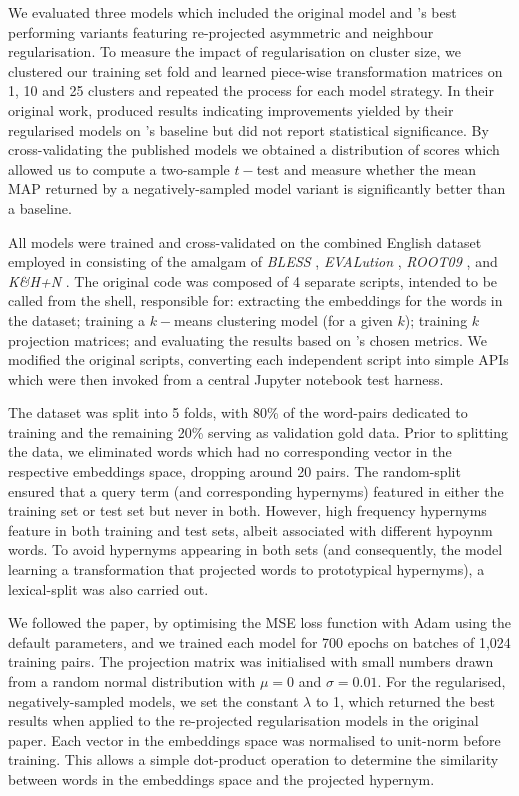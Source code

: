 We evaluated three models which included the original \citep{Fu2014} model and \citeauthor{ustalov2017negative}'s best performing variants featuring re-projected asymmetric and neighbour regularisation.  To measure the impact of regularisation on cluster size, we clustered our training set fold and learned piece-wise transformation matrices on 1, 10 and 25 clusters and repeated the process for each model strategy.  In their original work, \citeauthor{ustalov2017negative} produced results indicating improvements yielded by their regularised models on \citep{Fu2014}'s baseline but did not report statistical significance.  By cross-validating the published models we obtained a distribution of scores which allowed us to compute a two-sample $t-$test and measure whether the mean \ac{MAP} returned by a negatively-sampled model variant is significantly better than a baseline.  

All models were trained and cross-validated on the combined English dataset employed in \citep{ustalov2017negative} consisting of the amalgam of \textit{BLESS} \citep{Baroni2011}, \textit{EVALution} \citep{santus2015evalution}, \textit{ROOT09} \citep{santus2016nine}, and \textit{K\&H+N} \citep{necsulescu2015reading}.  The original code was composed of 4 separate scripts, intended to be called from the shell, responsible for: extracting the embeddings for the words in the dataset; training a $k-$means clustering model (for a given $k$); training $k$ projection matrices; and evaluating the results based on \citeauthor{ustalov2017negative}'s chosen metrics.  We modified the original scripts, converting each independent script into simple APIs which were then invoked from a central Jupyter notebook test harness.

The dataset was split into 5 folds, with 80\% of the word-pairs dedicated to training and the remaining 20\% serving as validation gold data.  Prior to splitting the data, we eliminated words which had no corresponding vector in the respective embeddings space, dropping around 20 pairs.  The random-split ensured that a query term (and corresponding hypernyms) featured in either the training set or test set but never in both.  However, high frequency hypernyms feature in both training and test sets, albeit associated with different hypoynm words.  To avoid hypernyms appearing in both sets (and consequently, the model learning a transformation that projected words to prototypical hypernyms), a lexical-split was also carried out.

We followed the paper, by optimising the MSE loss function with Adam \citep{kingma2014adam} using the default parameters, and we trained each model for 700 epochs on batches of 1,024 training pairs. The projection matrix was initialised with small numbers drawn from a random normal distribution with $\mu=0$ and $\sigma=0.01$.  For the regularised, negatively-sampled models, we set the constant $\lambda$ to 1, which returned the best results when applied to the re-projected regularisation models in the original paper.  Each vector in the embeddings space was normalised to unit-norm before training.  This allows a simple dot-product operation to determine the similarity between words in the embeddings space and the projected hypernym.

